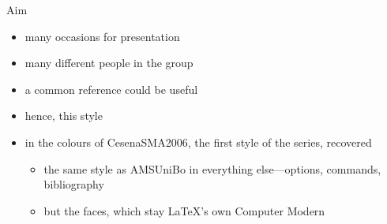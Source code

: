 \begin{frame}[c]{Aim}
%
\begin{itemize}
	\item many occasions for presentation
	\item many different people in the group
	\item a common reference could be useful
	\item hence, this style
	\item in the colours of \alert{CesenaSMA2006}, the first style of the series, recovered
	\begin{itemize}
		\item the same style as \alert{AMSUniBo} in everything else---options, commands, bibliography
		\item but the faces, which stay \LaTeX{}'s own Computer Modern
	\end{itemize}
\end{itemize}
%
\end{frame}
